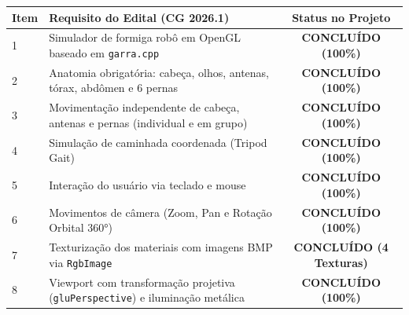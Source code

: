 \documentclass[11pt,a4paper]{article}
\begin{document}
\begin{table}[h!]
\centering
\small
\begin{tabularx}{\textwidth}{l p{7.5cm} c}
\toprule
\textbf{Item} & \textbf{Requisito do Edital (CG 2026.1)} & \textbf{Status no Projeto} \\
\midrule
1 & Simulador de formiga robô em OpenGL baseado em \texttt{garra.cpp} & \textbf{CONCLUÍDO (100\%)} \\
2 & Anatomia obrigatória: cabeça, olhos, antenas, tórax, abdômen e 6 pernas & \textbf{CONCLUÍDO (100\%)} \\
3 & Movimentação independente de cabeça, antenas e pernas (individual e em grupo) & \textbf{CONCLUÍDO (100\%)} \\
4 & Simulação de caminhada coordenada (Tripod Gait) & \textbf{CONCLUÍDO (100\%)} \\
5 & Interação do usuário via teclado e mouse & \textbf{CONCLUÍDO (100\%)} \\
6 & Movimentos de câmera (Zoom, Pan e Rotação Orbital 360°) & \textbf{CONCLUÍDO (100\%)} \\
7 & Texturização dos materiais com imagens BMP via \texttt{RgbImage} & \textbf{CONCLUÍDO (4 Texturas)} \\
8 & Viewport com transformação projetiva (\texttt{gluPerspective}) e iluminação metálica & \textbf{CONCLUÍDO (100\%)} \\
\bottomrule
\end{tabularx}
\end{table}
\end{document}
